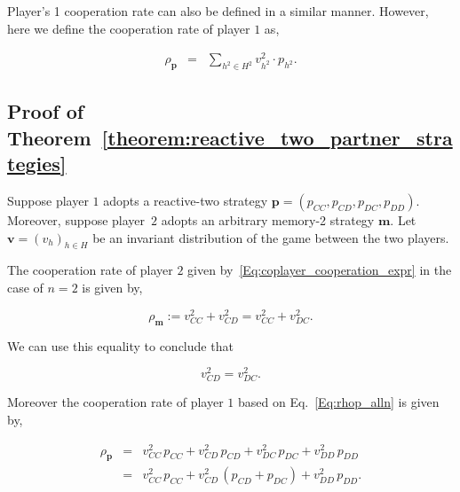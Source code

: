 \documentclass{article}
\theoremstyle{definition}
\begin{document}
Player's 1 cooperation rate can also be defined in a similar manner. However,
here we define the cooperation rate of player $1$ as,

\begin{equation} \label{Eq:rhop_alln}
  \begin{array}{lll}
    \rho_\mathbf{p} &= &\displaystyle \sum_{h^2 \in H^2} v^2_{h^2} \cdot p_{h^2}.
  \end{array}
\end{equation}


\subsection{Proof of Theorem~\ref{theorem:reactive_two_partner_strategies}}\label{appendix:reactive_two_akin_generalized}

Suppose player $1$ adopts a reactive-two strategy
$\mathbf{p}\!=\!(p_{CC},p_{CD}, p_{DC}, p_{DD})$. Moreover, suppose player~$2$
adopts an arbitrary memory-2 strategy $\mathbf{m}$. Let $\mathbf{v}=(v_h)_{h\in
H}$ be an invariant distribution of the game between the two players.

The cooperation rate of player $2$ given by~\ref{Eq:coplayer_cooperation_expr}
in the case of $n=2$ is given by,

\begin{equation} \label{Eq:rhoq_n2}
\rho_\mathbf{m} := v^2_{CC} + v^2_{CD} = v^2_{CC} + v^2_{DC}.
\end{equation}

We can use this equality to conclude that

\begin{equation} \label{Eq:EqualityV}
v^2_{CD} = v^2_{DC}.
\end{equation}

Moreover the cooperation rate of player $1$ based on Eq.~\ref{Eq:rhop_alln} is given by,

\begin{equation} \label{Eq:rhop_n2}
\begin{array}{lll}
\rho_\mathbf{p} &= &\displaystyle v^2_{CC}\, p_{CC} +  v^2_{CD}\,p_{CD} + v^2_{DC}\, p_{DC} + v^2_{DD}\, p_{DD}\\[0.2cm]
	& =  &v^2_{CC}\, p_{CC} +  v^2_{CD}\,(p_{CD}\!+\!p_{DC}) + v^2_{DD}\, p_{DD}.
\end{array}
\end{equation}
\end{document}
